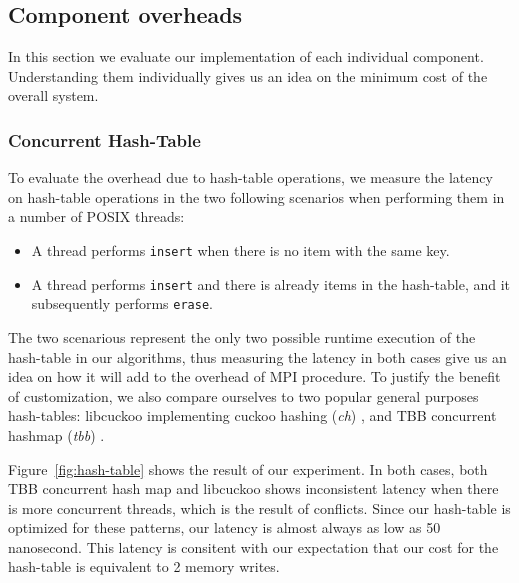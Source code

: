 \begin{figure*}[ht]
  \caption{Latency of our hash-table implementation (\textit{arr}) in comparison
  to libcuckoo (\textit{ch}) and tbb concurrent hash map (\textit{tbb}).  Each
  hash-table is created with the initial size of $2^{16}$, the number of
  insertion per thread is chosen so that there is enough room and no expansion is
  required. TBB is also compiled with \textit{tbb-malloc} to improve performance.
  Latency exceeds an 0.5 microsecond is not shown.\label{fig:hash-table}}

\end{figure*}

\subsection{Component overheads}
In this section we evaluate our implementation of each individual component.
Understanding them individually gives us an idea on the minimum cost of the overall
system.

\subsubsection{Concurrent Hash-Table}
To evaluate the overhead due to hash-table operations, we measure the latency 
on hash-table operations in the two following scenarios when performing them
in a number of POSIX threads:

\begin{itemize}
  \item A thread performs \texttt{insert} when there is no item with the same key.
  \item A thread performs \texttt{insert} and there is already items in the hash-table, and it subsequently
    performs \texttt{erase}.
\end{itemize}

 The two scenarious represent the only two possible runtime execution of the
 hash-table in our algorithms, thus measuring the latency in both cases give us
 an idea on how it will add to the overhead of MPI procedure. To justify the
 benefit of customization, we also compare ourselves to two popular general
 purposes hash-tables: libcuckoo implementing cuckoo hashing (\textit{ch})
 \cite{chasing}, and TBB concurrent hashmap (\textit{tbb}) \cite{tbb}.

Figure~\ref{fig:hash-table} shows the result of our experiment. In both cases,
both TBB concurrent hash map and libcuckoo shows inconsistent latency when
there is more concurrent threads, which is the result of conflicts. Since our
hash-table is optimized for these patterns, our latency is almost always as low
as 50 nanosecond. This latency is consitent with our expectation that our cost
for the hash-table is equivalent to 2 memory writes.

